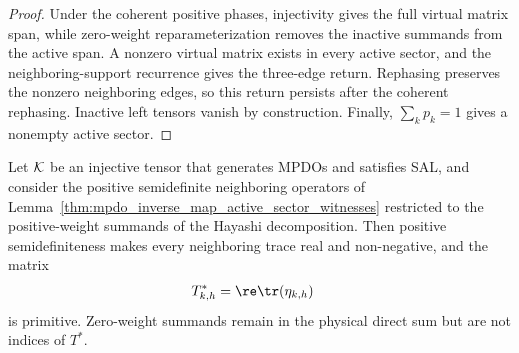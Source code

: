\begin{proof}
    \leanok
    Under the coherent positive phases, injectivity gives the full virtual
    matrix span, while zero-weight reparameterization removes the inactive
    summands from the active span. A nonzero virtual matrix exists in every
    active sector, and the neighboring-support recurrence gives the three-edge
    return. Rephasing preserves the nonzero neighboring edges, so this return
    persists after the coherent rephasing. Inactive left tensors vanish by
    construction. Finally, $\sum_kp_k=1$ gives a nonempty active sector.
\end{proof}

\begin{lemma}%
    \label{thm:mpdo_sector_trace_matrix_primitive}
    \leanok
    Let ${\cal K}$ be an injective tensor that generates MPDOs and satisfies
    SAL, and consider the positive semidefinite neighboring operators of
    Lemma~\ref{thm:mpdo_inverse_map_active_sector_witnesses} restricted to
    the positive-weight summands of the Hayashi decomposition. Then positive
    semidefiniteness makes every neighboring trace real and non-negative, and
    the matrix
    \begin{align}
        T^*_{k,h}
         & =\re\tr(\eta_{k,h})
        \notag
    \end{align}
    is primitive. Zero-weight summands remain in the physical direct sum but
    are not indices of $T^*$.

\end{lemma}

